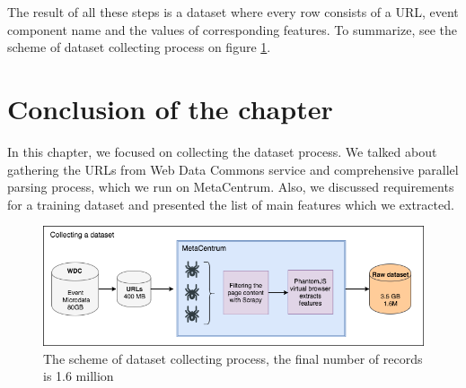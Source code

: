 The result of all these steps is a dataset where every row consists of a URL, event component name and the values of corresponding features. To summarize, see the scheme of dataset collecting process on figure \ref{fig:collect}. 

\section*{Conclusion of the chapter}

In this chapter, we focused on collecting the dataset process. We talked about gathering the URLs from Web Data Commons service and comprehensive parallel parsing process, which we run on MetaCentrum. Also, we discussed requirements for a training dataset and presented the list of main features which we extracted. 

\begin{figure}[h]
\begin{center}
\includegraphics[width=1.0\textwidth]{dataset_collect}
\caption{The scheme of dataset collecting process, the final number of records is 1.6 million}
\label{fig:collect}
\end{center}
\end{figure}
